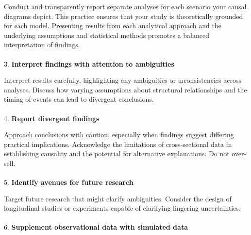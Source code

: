 \documentclass[
  singlecolumn]{article}
\makeatletter
\let\oldparagraph\paragraph
\renewcommand{\paragraph}{
    \@ifstar
      \xxxParagraphStar
      \xxxParagraphNoStar
  }
\newcommand{\xxxParagraphStar}[1]{\oldparagraph*{#1}\mbox{}}
\newcommand{\xxxParagraphNoStar}[1]{\oldparagraph{#1}\mbox{}}
\makeatother
\begin{document}
Conduct and transparently report separate analyses for each scenario
your causal diagrams depict. This practice ensures that your study is
theoretically grounded for each model. Presenting results from each
analytical approach and the underlying assumptions and statistical
methods promotes a balanced interpretation of findings.

\paragraph{\texorpdfstring{3. \textbf{Interpret findings with attention
to
ambiguities}}{3. Interpret findings with attention to ambiguities}}\label{interpret-findings-with-attention-to-ambiguities}

Interpret results carefully, highlighting any ambiguities or
inconsistencies across analyses. Discuss how varying assumptions about
structural relationships and the timing of events can lead to divergent
conclusions.

\paragraph{\texorpdfstring{4. \textbf{Report divergent
findings}}{4. Report divergent findings}}\label{report-divergent-findings}

Approach conclusions with caution, especially when findings suggest
differing practical implications. Acknowledge the limitations of
cross-sectional data in establishing causality and the potential for
alternative explanations. Do not over-sell.

\paragraph{\texorpdfstring{5. \textbf{Identify avenues for future
research}}{5. Identify avenues for future research}}\label{identify-avenues-for-future-research}

Target future research that might clarify ambiguities. Consider the
design of longitudinal studies or experiments capable of clarifying
lingering uncertainties.

\paragraph{\texorpdfstring{6. \textbf{Supplement observational data with
simulated
data}}{6. Supplement observational data with simulated data}}\label{supplement-observational-data-with-simulated-data}
\end{document}
